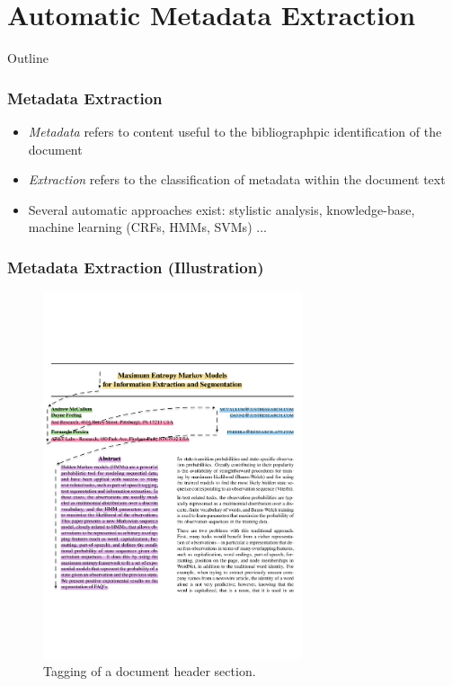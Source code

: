\documentclass{beamer}
\begin{document}
\section{Automatic Metadata Extraction}


\begin{frame}[noframenumbering]{Outline}
\end{frame}


\begin{frame}
\frametitle{Metadata Extraction}
\begin{itemize}
\item \emph{Metadata} refers to content useful to the bibliographpic identification of the document
\item \emph{Extraction} refers to the classification of metadata within the document text
\item Several automatic approaches exist: stylistic analysis, knowledge-base, machine learning (CRFs, HMMs, SVMs) ...
\end{itemize}
\end{frame}


\begin{frame}
\frametitle{Metadata Extraction (Illustration)}
\begin{figure}[h]
\center
\includegraphics[width=3in]{Figures/extraction.pdf}
\caption{Tagging of a document header section.}
\end{figure}
\end{frame}
\end{document}
